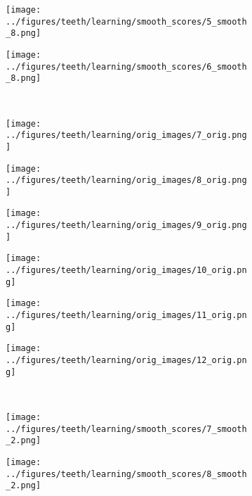 \begin{figure}[h!]
\begin{subfigure}{0.16\textwidth}
		\centering
		\texttt{[image: ../figures/teeth/learning/smooth\_scores/5\_smooth\_8.png]}
		\label{fig:1}
	\end{subfigure}
	\begin{subfigure}{0.16\textwidth}
		\centering
		\texttt{[image: ../figures/teeth/learning/smooth\_scores/6\_smooth\_8.png]}
		\label{fig:1}
	\end{subfigure}
	\\
	\begin{subfigure}{0.16\textwidth}
		\centering
		\texttt{[image: ../figures/teeth/learning/orig\_images/7\_orig.png]}
		\label{fig:1}
	\end{subfigure}
	\begin{subfigure}{0.16\textwidth}
		\centering
		\texttt{[image: ../figures/teeth/learning/orig\_images/8\_orig.png]}
		\label{fig:1}
	\end{subfigure}
	\begin{subfigure}{0.16\textwidth}
		\centering
		\texttt{[image: ../figures/teeth/learning/orig\_images/9\_orig.png]}
		\label{fig:1}
	\end{subfigure}
	\begin{subfigure}{0.16\textwidth}
		\centering
		\texttt{[image: ../figures/teeth/learning/orig\_images/10\_orig.png]}
		\label{fig:1}
	\end{subfigure}
	\begin{subfigure}{0.16\textwidth}
		\centering
		\texttt{[image: ../figures/teeth/learning/orig\_images/11\_orig.png]}
		\label{fig:1}
	\end{subfigure}
	\begin{subfigure}{0.16\textwidth}
		\centering
		\texttt{[image: ../figures/teeth/learning/orig\_images/12\_orig.png]}
		\label{fig:1}
	\end{subfigure}
	\vspace{-0.35cm}
	\\
	\begin{subfigure}{0.16\textwidth}
		\centering
		\texttt{[image: ../figures/teeth/learning/smooth\_scores/7\_smooth\_2.png]}
		\label{fig:1}
	\end{subfigure}
	\begin{subfigure}{0.16\textwidth}
		\centering
		\texttt{[image: ../figures/teeth/learning/smooth\_scores/8\_smooth\_2.png]}
		\label{fig:1}
	\end{subfigure}

\end{figure}
